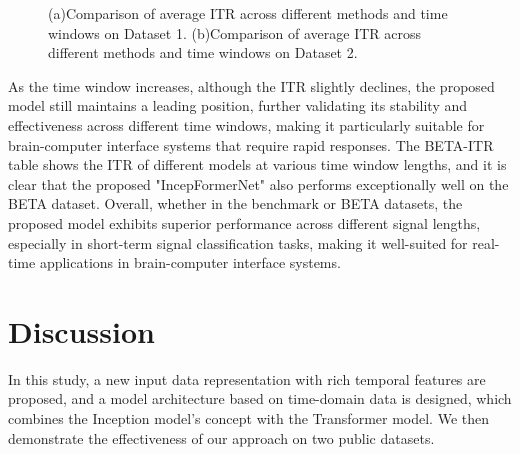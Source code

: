 \documentclass[10pt]{iopart}
\begin{document}
\begin{figure*}[ht]
    \centering
    \caption{(a)Comparison of average ITR across different methods and time windows on Dataset 1.
    (b)Comparison of average ITR across different methods and time windows on Dataset 2.}
\end{figure*}
As the time window increases, although the ITR slightly declines, the proposed model still maintains a leading position, further validating its stability and effectiveness across different time windows, making it particularly suitable for brain-computer interface systems that require rapid responses. The BETA-ITR table shows the ITR of different models at various time window lengths, and it is clear that the proposed "IncepFormerNet" also performs exceptionally well on the BETA dataset.
Overall, whether in the benchmark or BETA datasets, the proposed model exhibits superior performance across different signal lengths, especially in short-term signal classification tasks, making it well-suited for real-time applications in brain-computer interface systems.

\section{Discussion}
In this study, a new input data representation with rich temporal features are proposed, and a model architecture based on time-domain data is designed, which combines the Inception model's concept with the Transformer model. We then demonstrate the effectiveness of our approach on two public datasets.
\end{document}
